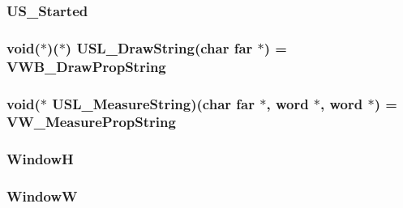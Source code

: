 \hypertarget{ID__US__1_8C_a587d3155d7e2c62fe813cffece29ca13}{
\subsubsection[{US\_\-Started}]{ {\bf US\_\-Started}}}
\label{ID__US__1_8C_a587d3155d7e2c62fe813cffece29ca13}
\hypertarget{ID__US__1_8C_a49825cde2ac607e0d17407fb33f14a00}{
\subsubsection[{USL\_\-DrawString}]{\setlength{\rightskip}{0pt plus 5cm}void($\ast$)($\ast$) {\bf USL\_\-DrawString}(char far $\ast$) = VWB\_\-DrawPropString}}
\label{ID__US__1_8C_a49825cde2ac607e0d17407fb33f14a00}
\hypertarget{ID__US__1_8C_ac392829f8abc2e03447a6abf023352b1}{
\subsubsection[{USL\_\-MeasureString}]{\setlength{\rightskip}{0pt plus 5cm}void($\ast$ {\bf USL\_\-MeasureString})(char far $\ast$, {\bf word} $\ast$, {\bf word} $\ast$) = VW\_\-MeasurePropString}}
\label{ID__US__1_8C_ac392829f8abc2e03447a6abf023352b1}
\hypertarget{ID__US__1_8C_aaeba48e7e4c3c27582d73da5718a0c0c}{
\subsubsection[{WindowH}]{ {\bf WindowH}}}
\label{ID__US__1_8C_aaeba48e7e4c3c27582d73da5718a0c0c}
\hypertarget{ID__US__1_8C_a417e7f10e3b946e0ce329aff1b619c3f}{
\subsubsection[{WindowW}]{ {\bf WindowW}}}
